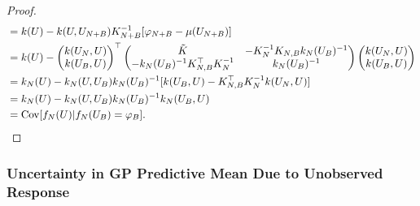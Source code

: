 \documentclass[12pt]{article}
\begin{document}
\begin{proof}
\begin{align*}
&= \gpKerPrior(\parMat) - \gpKerPrior(\parMat, \designIn[\Naugment]) \kerMat[\Naugment]^{-1}[\funcVal[\Naugment] - \gpMeanPrior(\designIn[\Naugment])] \\
&= \gpKerPrior(\parMat) - \begin{pmatrix} \gpKerPrior(\designIn[\Ndesign], \parMat) \\  \gpKerPrior(\designIn[\Nbatch], \parMat) \end{pmatrix}^\top
\begin{pmatrix} \tilde{K} & -\kerMat[\Ndesign]^{-1} \kerMat[\Ndesign,\Nbatch] \gpKer[\Ndesign](\designBatchIn)^{-1} \\
-\gpKer[\Ndesign](\designBatchIn)^{-1} \kerMat[\Ndesign,\Nbatch]^\top  \kerMat[\Ndesign]^{-1} & \gpKer[\Ndesign](\designBatchIn)^{-1} \end{pmatrix} 
\begin{pmatrix}  \gpKerPrior(\designIn[\Ndesign], \parMat) \\  \gpKerPrior(\designIn[\Nbatch], \parMat) \end{pmatrix} \\
&= \gpKer[\Ndesign](\parMat) - 
\gpKer[\Ndesign](\parMat, \designIn[\Nbatch]) \gpKer[\Ndesign](\designIn[\Nbatch])^{-1} [\gpKerPrior(\designIn[\Nbatch], \parMat) - \kerMat[\Ndesign,\Nbatch]^\top \kerMat[\Ndesign]^{-1}\gpKerPrior(\designIn[\Ndesign], \parMat)] \\
&= \gpKer[\Ndesign](\parMat) -  \gpKer[\Ndesign](\parMat, \designIn[\Nbatch]) \gpKer[\Ndesign](\designIn[\Nbatch])^{-1} \gpKer[\Ndesign](\designIn[\Nbatch], \parMat) \\
&= \Cov[\funcEm[\Ndesign](\parMat) | \funcEm[\Ndesign](\designIn[\Nbatch]) = \funcVal[\Nbatch]].
\end{align*}

\end{proof}


\subsubsection{Uncertainty in GP Predictive Mean Due to Unobserved Response}
\end{document}
